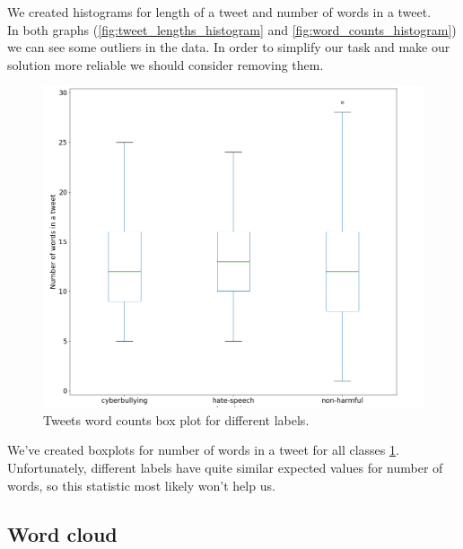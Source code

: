 \documentclass[a4paper]{article}
\begin{document}
We created histograms for length of a tweet and number of words in a tweet. \\
In both graphs (\ref{fig:tweet_lengths_histogram} and \ref{fig:word_counts_histogram}) we can see some outliers in the data. In order to simplify our task and make our solution more reliable we should consider removing them.


\begin{figure}[H]
\centering
\includegraphics[width=\textwidth]{plots/tweet_word_counts_box_plot.png}
\caption{Tweets word counts box plot for different labels.}
\label{fig:box_plot}
\end{figure}

We've created boxplots for number of words in a tweet for all classes \ref{fig:box_plot}. \\
Unfortunately, different labels have quite similar expected values for number of words, so this statistic most likely won't help us.

\subsection{Word cloud}
\end{document}
